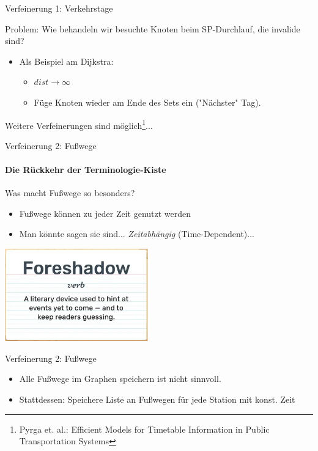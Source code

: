 \begin{frame}{Verfeinerung 1: Verkehrstage}
	\begin{block}{}
		Problem: Wie behandeln wir besuchte Knoten beim SP-Durchlauf, die invalide sind?
	\end{block}

	\pause
	\begin{itemize}
		\item Als Beispiel am Dijkstra: 
		\begin{itemize}
			\item $dist \rightarrow \infty$
			\item Füge Knoten wieder am Ende des Sets ein ("{}Nächster"{} Tag).
		\end{itemize}
	\end{itemize}
	\vspace{5em}
	Weitere Verfeinerungen sind möglich\footnote{Pyrga et. al.: Efficient Models for Timetable Information in Public Transportation Systems}...
\end{frame}


\begin{frame}{Verfeinerung 2: Fußwege}
	\framesubtitle{Die Rückkehr der Terminologie-Kiste}
	\begin{block}{}
		Was macht Fußwege so besonders?
	\end{block}
	\pause
	\begin{itemize}
		\item Fußwege können zu jeder Zeit genutzt werden
		\item Man könnte sagen sie sind... \textit{Zeitabhängig} (Time-Dependent)...
	\end{itemize}

	\begin{center}
		\includegraphics[height=4cm]{images/foreshadowing.png} 
	\end{center}
\end{frame}


\begin{frame}{Verfeinerung 2: Fußwege}
	\begin{itemize}
		\item Alle Fußwege im Graphen speichern ist nicht sinnvoll.
		\pause
		\item Stattdessen: Speichere Liste an Fußwegen für jede Station mit konst. Zeit
	\end{itemize}
\end{frame}


